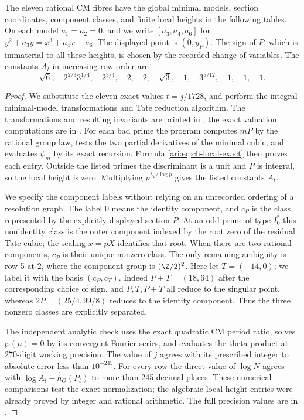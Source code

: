 \begin{proposition}\label{ari:C.6.3}
The eleven rational CM fibres have the global minimal models,
section coordinates, component classes, and finite local heights
in the following tables. On each model $a_1=a_2=0$, and we
write $[a_3,a_4,a_6]$ for
$y^2+a_3y=x^3+a_4x+a_6$. The displayed point is $(0,y_P)$.
The sign of $P$, which is immaterial to all these heights,
is chosen by the recorded change of variables.
The constants $A_t$ in increasing row order are
\[
 \sqrt6,\quad 2^{2/3}3^{1/4},\quad 2^{3/4},\quad
 2,\quad 2,\quad \sqrt3,\quad 1,\quad 3^{5/12},\quad
 1,\quad1,\quad1.
\]
\end{proposition}
\begin{proof}
We substitute the eleven exact values $t=j/1728$, and perform
the integral minimal-model transformations and Tate reduction
algorithm. The transformations and resulting invariants are
printed in ; the exact valuation
computations are in .
For each bad prime the program computes $mP$ by the rational
group law, tests the two partial derivatives of the minimal
cubic, and evaluates $\psi_m$ by its exact recursion. Formula
\eqref{ari:eq:ch-local-exact} then proves each entry. Outside the
listed primes the discriminant is a unit and $P$ is integral,
so the local height is zero. Multiplying $p^{\lambda_p/\log p}$
gives the listed constants $A_t$.

We specify the component labels without relying on an
unrecorded ordering of a resolution graph. The label $0$
means the identity component, and $c_P$ is the class represented
by the explicitly displayed section $P$. At an odd prime of
type $I_0^*$ this nonidentity class is the outer component
indexed by the root zero of the residual Tate cubic; the
scaling $x=pX$ identifies that root. When there are two
rational components, $c_P$ is their unique nonzero class.
The only remaining ambiguity is row 5 at $2$, where the
component group is $(\Z/2)^2$. Here let $T=(-14,0)$;
we label it with the basis $(c_P,c_T)$. Indeed
$P+T=(18,64)$ after the corresponding choice of sign,
and $P,T,P+T$ all reduce to the singular point, whereas
$2P=(25/4,99/8)$ reduces to the identity component.
Thus the three nonzero classes are explicitly separated.

The independent analytic check uses the exact quadratic CM
period ratio, solves $\wp(\mu)=0$ by its convergent Fourier
series, and evaluates the theta product at 270-digit working
precision. The value of $j$ agrees with its prescribed integer
to absolute error less than $10^{-245}$. For every row the
direct value of $\log N$ agrees with
$\log A_t-\widehat h_O(P_t)$ to more than 245 decimal places.
These numerical comparisons test the exact normalization;
the algebraic local-height entries were already proved by
integer and rational arithmetic. The full precision values
are in .
\end{proof}

